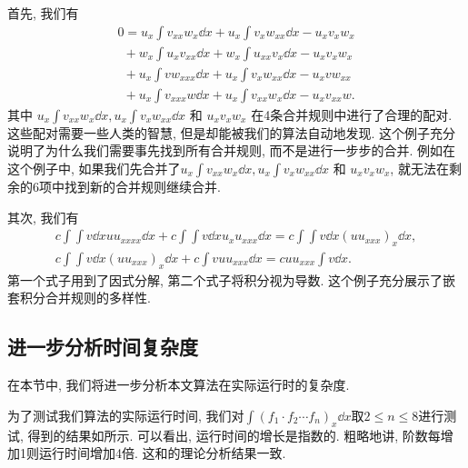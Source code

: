 首先, 我们有 
\begin{equation}
\renewcommand{\arraystretch}{1.0}
\begin{array}{l}
0=u_x\int\!{v_{xx}w_x\dd x}+u_x\int\!{v_xw_{xx}\dd x}-u_xv_xw_x\\
~~+w_x\int\!{u_xv_{xx}\dd x}+w_x\int\!{u_{xx}v_x\dd x}-u_xv_xw_x\\
~~+u_x\int\!{vw_{xxx}\dd x}+u_x\int\!{v_xw_{xx}\dd x}-u_xvw_{xx}\\
~~+u_x\int\!{v_{xxx}w\dd x}+u_x\int\!{v_{xx}w_x\dd x}-u_xv_{xx}w.
\end{array}
\label{counter_example}
\end{equation}
其中 $u_x\int\!{v_{xx}w_x\dd x},u_x\int\!{v_xw_{xx}\dd x}$ 和 $u_xv_xw_x$ 在4条合并规则中进行了合理的配对. 这些配对需要一些人类的智慧, 但是却能被我们的算法自动地发现. 这个例子充分说明了为什么我们需要事先找到所有合并规则, 而不是进行一步步的合并. 例如在这个例子中, 如果我们先合并了$u_x\int\!{v_{xx}w_x\dd x},u_x\int\!{v_xw_{xx}\dd x}$ 和 $u_xv_xw_x$, 就无法在剩余的6项中找到新的合并规则继续合并. 

其次, 我们有 
\begin{equation}
\renewcommand{\arraystretch}{1.2}
\begin{array}{c}
c\int\!{\int\!{v\dd x}uu_{xxxx}\dd x}+c\int\!{\int\!{v\dd x}u_xu_{xxx}\dd x}=c\int\!{\int\!{v\dd x}(uu_{xxx})_x\dd x},\\
c\int\!{\int\!{v\dd x}(uu_{xxx})_x\dd x}+c\int\!{vuu_{xxx}\dd x}=cuu_{xxx}\int\!{v\dd x}.
\end{array}
\end{equation} 
第一个式子用到了因式分解, 第二个式子将积分视为导数. 这个例子充分展示了嵌套积分合并规则的多样性. 

\subsection{进一步分析时间复杂度}\label{sec5.2-03}
在本节中, 我们将进一步分析本文算法在实际运行时的复杂度. 

为了测试我们算法的实际运行时间, 我们对$\int\!{(f_1\cdot f_2\cdots f_n)_x \dd x}$取$2\le n \le 8$进行测试, 得到的结果如所示. 可以看出, 运行时间的增长是指数的. 粗略地讲, 阶数每增加1则运行时间增加4倍. 这和的理论分析结果一致. 

